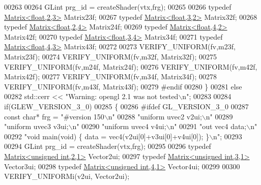 \begin{DoxyCode}
00263         
00264       GLint prg\_id = createShader(vtx,frg);
00265       
00266       \textcolor{keyword}{typedef} \hyperlink{group___core___module_class_eigen_1_1_matrix}{Matrix<float,2,3>} Matrix23f;
00267       \textcolor{keyword}{typedef} \hyperlink{group___core___module_class_eigen_1_1_matrix}{Matrix<float,3,2>} Matrix32f;
00268       \textcolor{keyword}{typedef} \hyperlink{group___core___module_class_eigen_1_1_matrix}{Matrix<float,2,4>} Matrix24f;
00269       \textcolor{keyword}{typedef} \hyperlink{group___core___module_class_eigen_1_1_matrix}{Matrix<float,4,2>} Matrix42f;
00270       \textcolor{keyword}{typedef} \hyperlink{group___core___module_class_eigen_1_1_matrix}{Matrix<float,3,4>} Matrix34f;
00271       \textcolor{keyword}{typedef} \hyperlink{group___core___module_class_eigen_1_1_matrix}{Matrix<float,4,3>} Matrix43f;
00272       
00273       VERIFY\_UNIFORM(fv,m23f, Matrix23f);
00274       VERIFY\_UNIFORM(fv,m32f, Matrix32f);
00275       VERIFY\_UNIFORM(fv,m24f, Matrix24f);
00276       VERIFY\_UNIFORM(fv,m42f, Matrix42f);
00277       VERIFY\_UNIFORM(fv,m34f, Matrix34f);
00278       VERIFY\_UNIFORM(fv,m43f, Matrix43f);
00279 \textcolor{preprocessor}{      #endif}
00280     \}
00281     \textcolor{keywordflow}{else}
00282       std::cerr << \textcolor{stringliteral}{"Warning: opengl 2.1 was not tested\(\backslash\)n"};
00283     
00284     \textcolor{keywordflow}{if}(GLEW\_VERSION\_3\_0)
00285     \{
00286 \textcolor{preprocessor}{      #ifdef GL\_VERSION\_3\_0}
00287       \textcolor{keyword}{const} \textcolor{keywordtype}{char}* frg = \textcolor{stringliteral}{"#version 150\(\backslash\)n"}
00288         \textcolor{stringliteral}{"uniform uvec2 v2ui;\(\backslash\)n"}
00289         \textcolor{stringliteral}{"uniform uvec3 v3ui;\(\backslash\)n"}
00290         \textcolor{stringliteral}{"uniform uvec4 v4ui;\(\backslash\)n"}
00291         \textcolor{stringliteral}{"out vec4 data;\(\backslash\)n"}
00292         \textcolor{stringliteral}{"void main(void) \{ data = vec4(v2ui[0]+v3ui[0]+v4ui[0]); \}\(\backslash\)n"};
00293         
00294       GLint prg\_id = createShader(vtx,frg);
00295       
00296       \textcolor{keyword}{typedef} \hyperlink{group___core___module_class_eigen_1_1_matrix}{Matrix<unsigned int,2,1>} Vector2ui;
00297       \textcolor{keyword}{typedef} \hyperlink{group___core___module_class_eigen_1_1_matrix}{Matrix<unsigned int,3,1>} Vector3ui;
00298       \textcolor{keyword}{typedef} \hyperlink{group___core___module_class_eigen_1_1_matrix}{Matrix<unsigned int,4,1>} Vector4ui;
00299       
00300       VERIFY\_UNIFORMi(v2ui, Vector2ui);

\end{DoxyCode}
